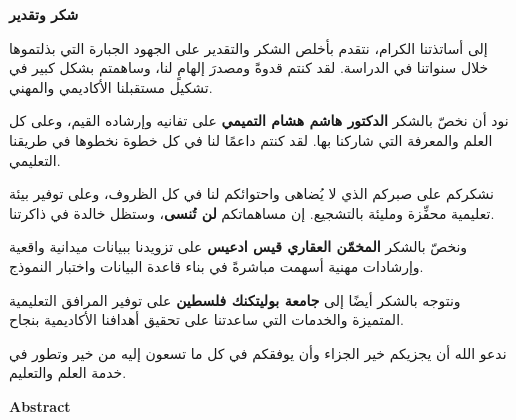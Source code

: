 \documentclass[12pt,oneside]{report}
\newenvironment{ARcentercol}[1][0.8\textwidth]{%
  \begin{Arabic}\begin{center}\begin{minipage}{#1}\justifying
}{%
  \end{minipage}\end{center}\end{Arabic}
}
\begin{document}
\vspace{2em}

\begin{center}\Large\bfseries \textarabic{شكر وتقدير}\end{center}
\begin{ARcentercol}
إلى أساتذتنا الكرام، نتقدم بأخلص الشكر والتقدير على الجهود الجبارة التي بذلتموها خلال سنواتنا في الدراسة. لقد كنتم قدوةً ومصدرَ إلهامٍ لنا، وساهمتم بشكل كبير في تشكيل مستقبلنا الأكاديمي والمهني.

\medskip

نود أن نخصّ بالشكر \textbf{الدكتور هاشم هشام التميمي} على تفانيه وإرشاده القيم، وعلى كل العلم والمعرفة التي شاركنا بها. لقد كنتم داعمًا لنا في كل خطوة نخطوها في طريقنا التعليمي.

\medskip

نشكركم على صبركم الذي لا يُضاهى واحتوائكم لنا في كل الظروف، وعلى توفير بيئة تعليمية محفِّزة ومليئة بالتشجيع. إن مساهماتكم \textbf{لن تُنسى}، وستظل خالدة في ذاكرتنا.

\medskip

ونخصّ بالشكر \textbf{المخمّن العقاري قيس ادعيس} على تزويدنا ببيانات ميدانية واقعية وإرشادات مهنية أسهمت مباشرةً في بناء قاعدة البيانات واختبار النموذج.

\medskip

ونتوجه بالشكر أيضًا إلى \textbf{جامعة بوليتكنك فلسطين} على توفير المرافق التعليمية المتميزة والخدمات التي ساعدتنا على تحقيق أهدافنا الأكاديمية بنجاح.

\medskip

ندعو الله أن يجزيكم خير الجزاء وأن يوفقكم في كل ما تسعون إليه من خير وتطور في خدمة العلم والتعليم.
\end{ARcentercol}



\clearpage
{}
{}
\begin{center}
  \Large\bfseries Abstract
\end{center}
\end{document}
